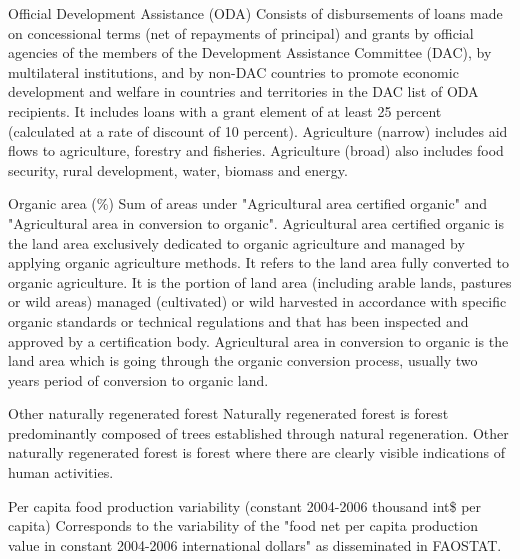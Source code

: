 \begin{MetadataCollection} {}
\begin{Energy consumption in agriculture, total} {}
\begin{metadata}{Official Development Assistance (ODA)} {}
Consists of disbursements of loans made on concessional terms (net of repayments of principal) and grants by official agencies of the members of the Development Assistance Committee (DAC), by multilateral institutions, and by non-DAC countries to promote economic development and welfare in countries and territories in the DAC list of ODA recipients. It includes loans with a grant element of at least 25 percent (calculated at a rate of discount of 10 percent). Agriculture (narrow) includes aid flows to agriculture, forestry and fisheries.  Agriculture (broad) also includes  food security, rural development, water, biomass and energy. 
\end{metadata}

\begin{metadata}{Organic area (\%)} {}
Sum of areas under "Agricultural area certified organic" and "Agricultural area in conversion to organic". Agricultural area certified organic is the land area exclusively dedicated to organic agriculture and managed by applying organic agriculture methods. It refers to the land area fully converted to organic agriculture. It is the portion of land area (including arable lands, pastures or wild areas) managed (cultivated) or wild harvested in accordance with specific organic standards or technical regulations and that has been inspected and approved by a certification body. Agricultural area in conversion to organic is the land area which is going through the organic conversion process, usually two years period of conversion to organic land.
\end{metadata}

\begin{metadata}{Other naturally regenerated forest} {}
Naturally regenerated forest is forest predominantly composed of trees established through natural regeneration. Other naturally regenerated forest is forest where there are clearly visible indications of human activities.
\end{metadata}

\begin{metadata}{Per capita food production variability (constant 2004-2006 thousand int\$ per capita)} {}
Corresponds to the variability of the "food net per capita production value in constant 2004-2006 international dollars" as disseminated in FAOSTAT.
\end{metadata}


\end{Energy consumption in agriculture, total}
\end{MetadataCollection}
